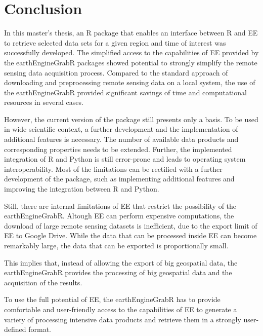 
\chapter{Conclusion}


In this master's thesis, an R package that enables an interface between R and EE to retrieve selected data sets for a given region and time of interest was successfully developed. The simplified access to the capabilities of EE provided by the earthEngineGrabR packages showed potential to strongly simplify the remote sensing data acquisition process. Compared to the standard approach of downloading and preprocessing remote sensing data on a local system, the use of the earthEngineGrabR provided significant savings of time and computational resources in several cases. 

However, the current version of the package still presents only a basis. To be used in wide scientific context, a further development and the implementation of additional features is necessary. 
The number of available data products and corresponding properties needs to be extended.
Further, the implemented integration of R and Python is still error-prone and leads to operating system interoperability.  
Most of the limitations can be rectified with a further development of the package, such as implementing additional features and improving the integration between R and Python.

Still, there are internal limitations of EE that restrict the possibility of the earthEngineGrabR. Altough EE can perform expensive computations, the download of large remote sensing datasets is inefficient, due to the export limit of EE to Google Drive. While the data that can be processed inside EE can become remarkably large, the data that can be exported is proportionally small.

This implies that, instead of allowing the export of big geospatial data, the earthEngineGrabR provides the processing of big geospatial data and the acquisition of the results.

To use the full potential of EE, the earthEngineGrabR has to provide comfortable and user-friendly access to the capabilities of EE to generate a variety of processing intensive data products and retrieve them in a strongly user-defined format.



